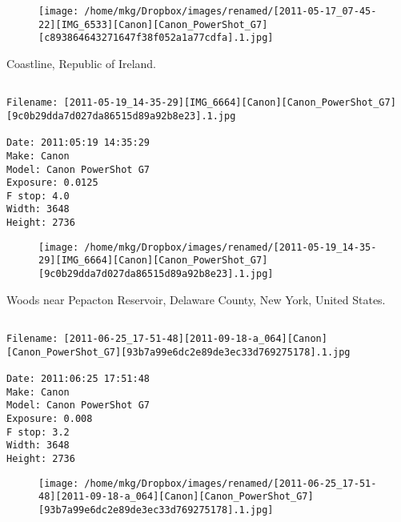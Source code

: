 \begin{figure}
\texttt{[image: /home/mkg/Dropbox/images/renamed/[2011-05-17\_07-45-22][IMG\_6533][Canon][Canon\_PowerShot\_G7][c893864643271647f38f052a1a77cdfa].1.jpg]}
\end{figure}
    
\clearpage
\onecolumn
\noindent Coastline, Republic of Ireland.
\noindent
\begin{lstlisting}

Filename: [2011-05-19_14-35-29][IMG_6664][Canon][Canon_PowerShot_G7][9c0b29dda7d027da86515d89a92b8e23].1.jpg

Date: 2011:05:19 14:35:29
Make: Canon
Model: Canon PowerShot G7
Exposure: 0.0125
F stop: 4.0
Width: 3648
Height: 2736
\end{lstlisting}
\clearpage

\begin{figure}
\texttt{[image: /home/mkg/Dropbox/images/renamed/[2011-05-19\_14-35-29][IMG\_6664][Canon][Canon\_PowerShot\_G7][9c0b29dda7d027da86515d89a92b8e23].1.jpg]}
\end{figure}
    
\clearpage
\onecolumn
\noindent Woods near Pepacton Reservoir, Delaware County, New York, United States.
\noindent
\begin{lstlisting}

Filename: [2011-06-25_17-51-48][2011-09-18-a_064][Canon][Canon_PowerShot_G7][93b7a99e6dc2e89de3ec33d769275178].1.jpg

Date: 2011:06:25 17:51:48
Make: Canon
Model: Canon PowerShot G7
Exposure: 0.008
F stop: 3.2
Width: 3648
Height: 2736
\end{lstlisting}
\clearpage

\begin{figure}
\texttt{[image: /home/mkg/Dropbox/images/renamed/[2011-06-25\_17-51-48][2011-09-18-a\_064][Canon][Canon\_PowerShot\_G7][93b7a99e6dc2e89de3ec33d769275178].1.jpg]}
\end{figure}
    

